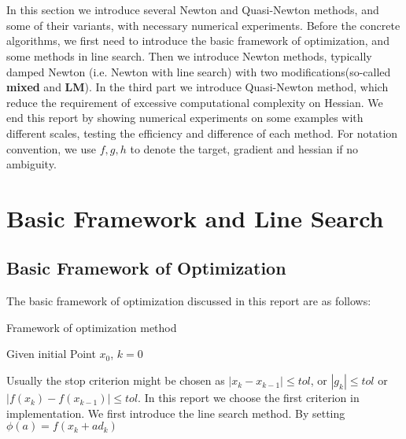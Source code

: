 \documentclass{article}
\begin{document}
	\maketitle
	\thispagestyle{fancy}
	\tableofcontents
	
	\section*{}
In this section we introduce several Newton and Quasi-Newton methods, and some of their variants, with necessary numerical experiments. Before the concrete algorithms, we first need to introduce the basic framework of optimization, and some methods in line search. Then we introduce Newton methods, typically damped Newton (i.e. Newton with line search) with two modifications(so-called \textbf{mixed} and \textbf{LM}). In the third part we introduce Quasi-Newton method, which reduce the requirement of excessive computational complexity on Hessian. We end this report by showing numerical experiments on some examples with different scales, testing the efficiency and difference of each method. For notation convention, we use $f,g,h$ to denote the target, gradient and hessian if no ambiguity.

\section{Basic Framework and Line Search}
\subsection{Basic Framework of Optimization}
The basic framework of optimization discussed in this report are as follows:
\begin{algorithm}[H]
\label{alg:framework}
	\caption{Framework of optimization method}
	Given initial Point $x_0$, $k=0$
	
	
\end{algorithm}
Usually the stop criterion might be chosen as $|x_{k} - x_{k-1}| \le tol$, or $|g_{k}| \le tol$ or $|f(x_k) - f(x_{k-1})| \le tol$. In this report we choose the first criterion in implementation.
We first introduce the line search method. By setting $\phi(a) = f(x_k + ad_k)$
\end{document}

